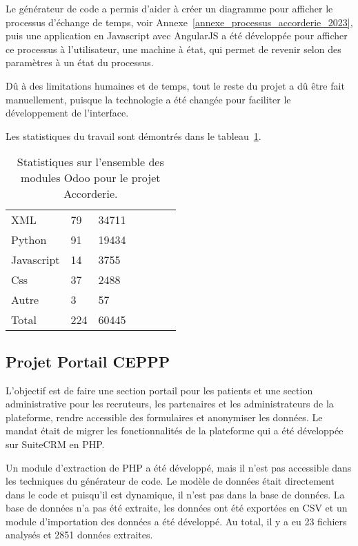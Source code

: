 Le générateur de code a permis d’aider à créer un diagramme pour afficher le processus d’échange de temps, voir Annexe~\ref{annexe_processus_accorderie_2023}, puis une application en Javascript avec AngularJS a été développée pour afficher ce processus à l’utilisateur, une machine à état, qui permet de revenir selon des paramètres à un état du processus.

Dû à des limitations humaines et de temps, tout le reste du projet a dû être fait manuellement, puisque la technologie a été changée pour faciliter le développement de l’interface.

Les statistiques du travail sont démontrés dans le tableau~\ref{tab:stat_code_accorderie}.


\begin{table}[htb]
\caption{Statistiques sur l'ensemble des modules Odoo pour le projet Accorderie.}
\centering
\begin{tabular}{|l|l|l|l|l|l|l|}

\hline
\cellcolor[HTML]{d9d9d9}{\textbf{Langage}} & \cellcolor[HTML]{d9d9d9}{\textbf{Fichiers}} & \cellcolor[HTML]{d9d9d9}{\textbf{Code}}\\\hline

XML & 79 & 34711\\\hline
Python & 91 & 19434\\\hline
Javascript & 14 & 3755\\\hline
Css & 37 & 2488\\\hline
Autre & 3 & 57\\\hline
Total & 224 & 60445\\\hline

\end{tabular}
\label{tab:stat_code_accorderie}
\end{table}

\subsection{Projet Portail CEPPP}

L'objectif est de faire une section portail pour les patients et une section administrative pour les recruteurs, les partenaires et les administrateurs de la plateforme, rendre accessible des formulaires et anonymiser les données. Le mandat était de migrer les fonctionnalités de la plateforme qui a été développée sur SuiteCRM en PHP.

Un module d'extraction de PHP a été développé, mais il n'est pas accessible dans les techniques du générateur de code. Le modèle de données était directement dans le code et puisqu'il est dynamique, il n'est pas dans la base de données. La base de données n'a pas été extraite, les données ont été exportées en CSV et un module d'importation des données a été développé. Au total, il y a eu 23 fichiers analysés et 2851 données extraites.


